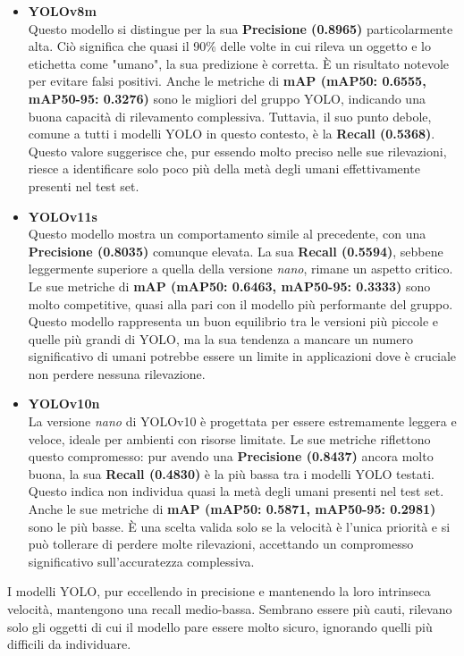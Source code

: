 \documentclass[12pt]{article}
\begin{document}
\begin{itemize}
    \item \textbf{YOLOv8m} \\
    Questo modello si distingue per la sua \textbf{Precisione (0.8965)} particolarmente alta. Ciò significa che quasi il 90\% delle volte in cui rileva un oggetto e lo etichetta come "umano", la sua predizione è corretta. È un risultato notevole per evitare falsi positivi. Anche le metriche di \textbf{mAP (mAP50: 0.6555, mAP50-95: 0.3276)} sono le migliori del gruppo YOLO, indicando una buona capacità di rilevamento complessiva. Tuttavia, il suo punto debole, comune a tutti i modelli YOLO in questo contesto, è la \textbf{Recall (0.5368)}. Questo valore suggerisce che, pur essendo molto preciso nelle sue rilevazioni, riesce a identificare solo poco più della metà degli umani effettivamente presenti nel test set.

    \item \textbf{YOLOv11s} \\
    Questo modello mostra un comportamento simile al precedente, con una \textbf{Precisione (0.8035)} comunque elevata. La sua \textbf{Recall (0.5594)}, sebbene leggermente superiore a quella della versione \textit{nano}, rimane un aspetto critico. Le sue metriche di \textbf{mAP (mAP50: 0.6463, mAP50-95: 0.3333)} sono molto competitive, quasi alla pari con il modello più performante del gruppo. Questo modello rappresenta un buon equilibrio tra le versioni più piccole e quelle più grandi di YOLO, ma la sua tendenza a mancare un numero significativo di umani potrebbe essere un limite in applicazioni dove è cruciale non perdere nessuna rilevazione.

    \item \textbf{YOLOv10n} \\
    La versione \textit{nano} di YOLOv10 è progettata per essere estremamente leggera e veloce, ideale per ambienti con risorse limitate. Le sue metriche riflettono questo compromesso: pur avendo una \textbf{Precisione (0.8437)} ancora molto buona, la sua \textbf{Recall (0.4830)} è la più bassa tra i modelli YOLO testati. Questo indica non individua quasi la metà degli umani presenti nel test set. Anche le sue metriche di \textbf{mAP (mAP50: 0.5871, mAP50-95: 0.2981)} sono le più basse. È una scelta valida solo se la velocità è l'unica priorità e si può tollerare di perdere molte rilevazioni, accettando un compromesso significativo sull'accuratezza complessiva.
\end{itemize}
I modelli YOLO, pur eccellendo in precisione e mantenendo la loro intrinseca velocità, mantengono una recall medio-bassa. Sembrano essere più cauti, rilevano solo gli oggetti di cui il modello pare essere molto sicuro, ignorando quelli più difficili da individuare.
\end{document}
